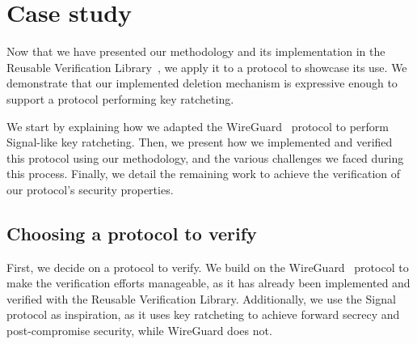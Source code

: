 
\chapter{Case study}
\label{chap:case-study}

Now that we have presented our methodology and its implementation in the Reusable Verification Library~\cite{ArquintSchwerhoffMehtaMueller23}, we apply it to a protocol to showcase its use. 
We demonstrate that our implemented deletion mechanism is expressive enough to support a protocol performing key ratcheting.

We start by explaining how we adapted the WireGuard~\cite{donenfeld2017wireguard} protocol to perform Signal-like key ratcheting.
Then, we present how we implemented and verified this protocol using our methodology, and the various challenges we faced during this process.
Finally, we detail the remaining work to achieve the verification of our protocol's security properties.

\section{Choosing a protocol to verify}
\label{sec:choosing-a-protocol-to-verify}

First, we decide on a protocol to verify.
We build on the WireGuard~\cite{donenfeld2017wireguard} protocol to make the verification efforts manageable, as it has already been implemented and verified with the Reusable Verification Library.
Additionally, we use the Signal~\cite{marlinspike2016x3dh} protocol as inspiration, as it uses key ratcheting to achieve forward secrecy and post-compromise security, while WireGuard does not.

